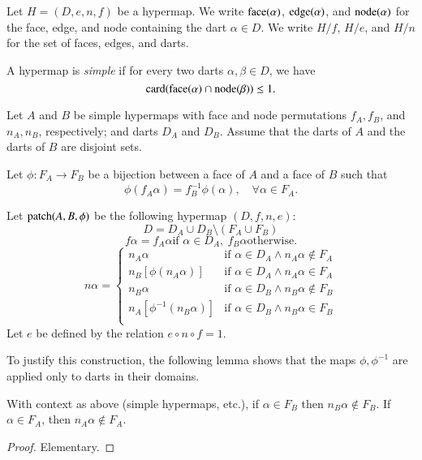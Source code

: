 Let $H=(D,e,n,f)$ be a hypermap.  We write
${\operatorname{face}}(\alpha)$, ${\operatorname{edge}}(\alpha)$, and ${\operatorname{node}}(\alpha)$
for the face, edge, and node containing the dart $\alpha\in D$.
We write $H/f$, $H/e$, and $H/n$ for the set of faces,
edges, and darts.


\begin{definition} 
A hypermap is {\it simple} if for every two darts
$\alpha,\beta\in D$, we have
    $${\operatorname{card}}{({\operatorname{face}}(\alpha) \cap {\operatorname{node}}(\beta))} \le 1.$$
\end{definition}


Let $A$ and $B$ be simple hypermaps with face and node
permutations
    $f_A,f_B$, and $n_A,n_B$, respectively; and darts $D_A$ and
    $D_B$.  Assume that the darts of $A$ and the darts of $B$ are
    disjoint sets.

Let $\phi:F_A\to F_B$ be a bijection between a face of $A$ and a
face of $B$ such that
    $$
    \phi(f_A \alpha) = f_B^{-1}\phi(\alpha),\quad \forall
    \alpha\in F_A.
    $$

\begin{definition} Let ${\operatorname{patch}}(A,B,\phi)$ be the following hypermap
$(D,f,n,e)$:
    $$D = D_A \cup D_B \setminus (F_A\cup F_B)$$
    $$f\alpha = f_A\alpha \text{if } \alpha\in D_A, \ f_B\alpha
    \text{otherwise}.
    $$
    $$n\alpha = \begin{cases}
    n_A\alpha &
        \text{if } \alpha\in D_A \wedge n_A\alpha\not\in F_A\\
    n_B[\phi(n_A\alpha)] &
        \text{if } \alpha\in D_A \wedge n_A\alpha\in F_A\\
    n_B\alpha &
        \text{if } \alpha\in D_B \wedge n_B\alpha\not\in F_B\\
    n_A[\phi^{-1}(n_B \alpha)] &
        \text{if } \alpha\in D_B \wedge n_B\alpha\in F_B\\
    \end{cases}
    $$
Let $e$ be defined by the relation $e\circ n\circ f = 1$.
\end{definition}

To justify this construction, the following lemma shows that the
maps $\phi,\phi^{-1}$ are applied only to darts in their domains.

\begin{lemma} With context as above (simple hypermaps, etc.),
if $\alpha\in F_B$ then $n_B\alpha\not\in F_B$.  If $\alpha\in
F_A$, then $n_A\alpha\not\in F_A$.
\end{lemma}

\begin{proof} Elementary.
\end{proof}


